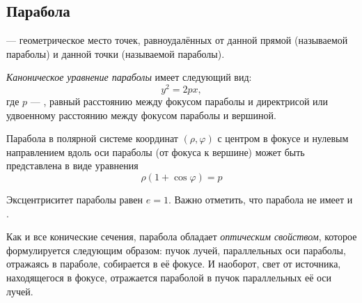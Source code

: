 \subsection{Парабола}

{\bfseries {}} --- геометрическое место точек, равноудалённых от данной прямой (называемой  параболы) и данной точки (называемой  параболы).

{\itshape Каноническое уравнение параболы} имеет следующий вид:
\begin{equation}
y^2=2px,
\end{equation}
где $p$ --- , равный расстоянию между фокусом параболы и директрисой или удвоенному расстоянию между фокусом параболы и вершиной.

Парабола в полярной системе координат $(\rho,\varphi)$ с центром в фокусе и нулевым направлением вдоль оси параболы (от фокуса к вершине) может быть представлена в виде уравнения
\begin{equation}
\rho(1+\cos\varphi)=p
\end{equation}

Эксцентриситет параболы равен $e=1$.
Важно отметить, что парабола не имеет  и .

Как и все конические сечения, парабола обладает \textit{оптическим свойством}, которое формулируется следующим образом: пучок лучей, параллельных оси параболы, отражаясь в параболе, собирается в её фокусе. И наоборот, свет от источника, находящегося в фокусе, отражается параболой в пучок параллельных её оси лучей.

